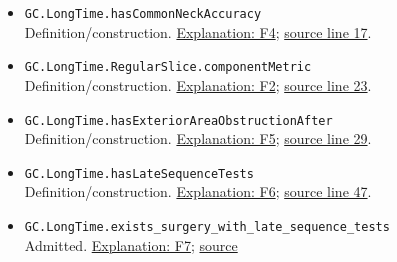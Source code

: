 \documentclass[
  letterpaper,
  11pt]{article}
\begin{document}
\begin{itemize}
\item
  {\small\texttt{GC.\allowbreak{}Long\allowbreak{}Time.\allowbreak{}has\allowbreak{}Common\allowbreak{}Neck\allowbreak{}Accuracy}}\\
  Definition/construction. \hyperref[f4-common-accuracy]{Explanation:
  F4};
  \href{https://github.com/qinz1yang/differential-geometry-dev/blob/ea0fae60ee01ef8c8d9b57a51794c6538f679c5d/DifferentialGeometry/Geometry/Flow/RicciFlow/LongTime/LateDecomposition.lean\#L17}{source
  line 17}.
\item
  {\small\texttt{GC.\allowbreak{}Long\allowbreak{}Time.\allowbreak{}Regular\allowbreak{}Slice.\allowbreak{}component\allowbreak{}Metric}}\\
  Definition/construction. \hyperref[f2-slices]{Explanation: F2};
  \href{https://github.com/qinz1yang/differential-geometry-dev/blob/ea0fae60ee01ef8c8d9b57a51794c6538f679c5d/DifferentialGeometry/Geometry/Flow/RicciFlow/LongTime/LateDecomposition.lean\#L23}{source
  line 23}.
\item
  {\small\texttt{GC.\allowbreak{}Long\allowbreak{}Time.\allowbreak{}has\allowbreak{}Exterior\allowbreak{}Area\allowbreak{}Obstruction\allowbreak{}After}}\\
  Definition/construction. \hyperref[f5-area-obstruction]{Explanation:
  F5};
  \href{https://github.com/qinz1yang/differential-geometry-dev/blob/ea0fae60ee01ef8c8d9b57a51794c6538f679c5d/DifferentialGeometry/Geometry/Flow/RicciFlow/LongTime/LateDecomposition.lean\#L29}{source
  line 29}.
\item
  {\small\texttt{GC.\allowbreak{}Long\allowbreak{}Time.\allowbreak{}has\allowbreak{}Late\allowbreak{}Sequence\allowbreak{}Tests}}\\
  Definition/construction. \hyperref[f6-sequence-tests]{Explanation:
  F6};
  \href{https://github.com/qinz1yang/differential-geometry-dev/blob/ea0fae60ee01ef8c8d9b57a51794c6538f679c5d/DifferentialGeometry/Geometry/Flow/RicciFlow/LongTime/LateDecomposition.lean\#L47}{source
  line 47}.
\item
  {\small\texttt{GC.\allowbreak{}Long\allowbreak{}Time.\allowbreak{}exists\_\allowbreak{}surgery\_\allowbreak{}with\_\allowbreak{}late\_\allowbreak{}sequence\_\allowbreak{}tests}}\\
  Admitted. \hyperref[f7-selected-flow]{Explanation: F7};
  \href{https://github.com/qinz1yang/differential-geometry-dev/blob/ea0fae60ee01ef8c8d9b57a51794c6538f679c5d/DifferentialGeometry/Geometry/Flow/RicciFlow/LongTime/LateDecomposition.lean\#L62}{source
}
\end{itemize}
\end{document}
